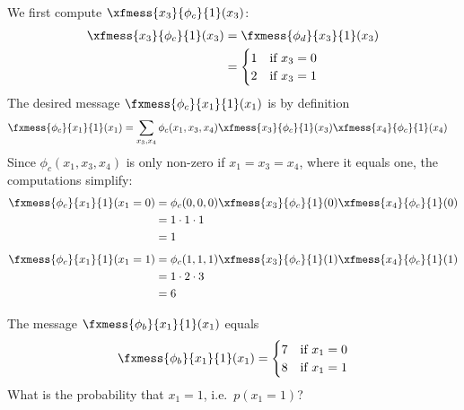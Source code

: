 \begin{exenumerate}
\begin{solution}
      We first compute $\xfmess{x_3}{\phi_c}{1}(x_3)$:
      \begin{align}
        \xfmess{x_3}{\phi_c}{1}(x_3) & = \fxmess{\phi_d}{x_3}{1}(x_3)\\
        & = \begin{cases}
          1 & \text{if } x_3=0\\
           2 & \text{if } x_3=1
        \end{cases}
      \end{align}
      The desired message $\fxmess{\phi_c}{x_1}{1}(x_1)$ is by definition
      \begin{align}
        \fxmess{\phi_c}{x_1}{1}(x_1) & = \sum_{x_3,x_4} \phi_c(x_1,x_3,x_4) \xfmess{x_3}{\phi_c}{1}(x_3) \xfmess{x_4}{\phi_c}{1}(x_4)
      \end{align}
      Since $\phi_c(x_1,x_3,x_4)$ is only non-zero if $x_1=x_3=x_4$, where it equals one, the computations simplify:
      \begin{align}
        \fxmess{\phi_c}{x_1}{1}(x_1=0) & = \phi_c(0,0,0) \xfmess{x_3}{\phi_c}{1}(0) \xfmess{x_4}{\phi_c}{1}(0)\\
        & = 1 \cdot 1 \cdot 1\\
        & = 1
      \end{align}
      \begin{align}
        \fxmess{\phi_c}{x_1}{1}(x_1=1) & = \phi_c(1,1,1) \xfmess{x_3}{\phi_c}{1}(1) \xfmess{x_4}{\phi_c}{1}(1)\\
        & = 1 \cdot 2 \cdot 3\\
        & = 6
      \end{align}
    \end{solution}

    
  \item The message $\fxmess{\phi_b}{x_1}{1}(x_1)$ equals
    $$ \fxmess{\phi_b}{x_1}{1}(x_1) = \begin{cases}
    7 & \text{if } x_1=0\\
    8 & \text{if } x_1=1\\
  \end{cases} $$
    What is the probability that $x_1=1$, i.e.\ $p(x_1=1)$?


\end{exenumerate}
